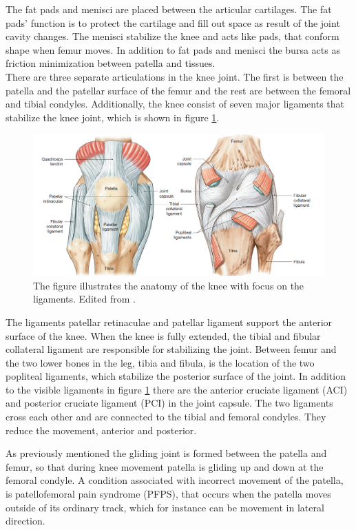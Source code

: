 The fat pads and menisci are placed between the articular cartilages. The fat pads’ function is to protect the cartilage and fill out space as result of the joint cavity changes. The menisci stabilize the knee and acts like pads, that conform shape when femur moves. In addition to fat pads and menisci the bursa acts as friction minimization between patella and tissues.\citep{Martini2012} \\
There are three separate articulations in the knee joint. The first is between the patella and the patellar surface of the femur and the rest are between the femoral and tibial condyles. Additionally, the knee consist of seven major ligaments that stabilize the knee joint, which is shown in figure \ref{fig:knee}.\citep{Martini2012}

\begin{figure} [H]
\centering
\includegraphics[width=1\textwidth]{figures/knee}
\caption{The figure illustrates the anatomy of the knee with focus on the ligaments. Edited from \citep{Martini2012}.}
\label{fig:knee}
\end{figure}

\noindent
The ligaments patellar retinaculae and patellar ligament support the anterior surface of the knee. When the knee is fully extended, the tibial and fibular collateral ligament are responsible for stabilizing the joint. Between femur and the two lower bones in the leg, tibia and fibula, is the location of the two popliteal ligaments, which stabilize the posterior surface of the joint. In addition to the visible ligaments in figure \ref{fig:knee} there are the anterior cruciate ligament (ACI) and posterior cruciate ligament (PCI) in the joint capsule. The two ligaments cross each other and are connected to the tibial and femoral condyles. They reduce the movement, anterior and posterior.\citep{Martini2012}

As previously mentioned the gliding joint is formed between the patella and femur, so that during knee movement patella is gliding up and down at the femoral condyle. A condition associated with incorrect movement of the patella, is patellofemoral pain syndrome (PFPS), that occurs when the patella moves outside of its ordinary track, which for instance can be movement in lateral direction.\citep{Martini2012}


